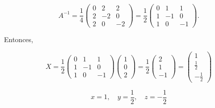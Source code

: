 \documentclass[a4paper,12pt]{article}
\begin{document}
\begin{ejercicio}[title=Ejercicio 25]
\[
A^{-1}
= \frac{1}{4}
\begin{pmatrix}
0 & 2 & 2\\
2 & -2 & 0\\
2 & 0 & -2
\end{pmatrix}
= \frac{1}{2}
\begin{pmatrix}
0 & 1 & 1\\
1 & -1 & 0\\
1 & 0 & -1
\end{pmatrix}.
\]

Entonces,

\[
X
= \frac{1}{2}
\begin{pmatrix}
0 & 1 & 1\\
1 & -1 & 0\\
1 & 0 & -1
\end{pmatrix}
\begin{pmatrix}
1\\ 0\\ 2
\end{pmatrix}
= \frac{1}{2}
\begin{pmatrix}
2\\ 1\\ -1
\end{pmatrix}
=
\begin{pmatrix}
1\\[2pt]
\tfrac12\\[2pt]
-\tfrac12
\end{pmatrix}
\]

\[
\boxed{\,x = 1,\quad y = \frac{1}{2},\quad z = -\frac{1}{2}\,}
\]
\end{ejercicio}
\end{document}
